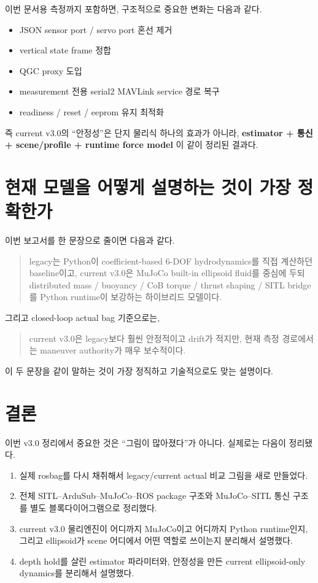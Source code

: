 \documentclass[11pt,a4paper]{article}
\begin{document}
이번 문서용 측정까지 포함하면, 구조적으로 중요한 변화는 다음과 같다.

\begin{itemize}[leftmargin=2em]
  \item JSON sensor port / servo port 혼선 제거
  \item vertical state frame 정합
  \item QGC proxy 도입
  \item measurement 전용 serial2 MAVLink service 경로 복구
  \item readiness / reset / eeprom 유지 최적화
\end{itemize}

즉 current v3.0의 ``안정성''은 단지 물리식 하나의 효과가 아니라, \textbf{estimator + 통신 + scene/profile + runtime force model} 이 같이 정리된 결과다.

\section{현재 모델을 어떻게 설명하는 것이 가장 정확한가}

이번 보고서를 한 문장으로 줄이면 다음과 같다.

\begin{quote}
legacy는 Python이 coefficient-based 6-DOF hydrodynamics를 직접 계산하던 baseline이고, current v3.0은 MuJoCo built-in ellipsoid fluid를 중심에 두되 distributed mass / buoyancy / CoB torque / thrust shaping / SITL bridge를 Python runtime이 보강하는 하이브리드 모델이다.
\end{quote}

그리고 closed-loop actual bag 기준으로는,

\begin{quote}
current v3.0은 legacy보다 훨씬 안정적이고 drift가 적지만, 현재 측정 경로에서는 maneuver authority가 매우 보수적이다.
\end{quote}

이 두 문장을 같이 말하는 것이 가장 정직하고 기술적으로도 맞는 설명이다.

\section{결론}

이번 v3.0 정리에서 중요한 것은 ``그림이 많아졌다''가 아니다. 실제로는 다음이 정리됐다.

\begin{enumerate}[leftmargin=2em]
  \item 실제 rosbag를 다시 채취해서 legacy/current actual 비교 그림을 새로 만들었다.
  \item 전체 SITL--ArduSub--MuJoCo--ROS package 구조와 MuJoCo--SITL 통신 구조를 별도 블록다이어그램으로 정리했다.
  \item current v3.0 물리엔진이 어디까지 MuJoCo이고 어디까지 Python runtime인지, 그리고 ellipsoid가 scene 어디에서 어떤 역할로 쓰이는지 분리해서 설명했다.
  \item depth hold를 살린 estimator 파라미터와, 안정성을 만든 current ellipsoid-only dynamics를 분리해서 설명했다.
\end{enumerate}
\end{document}
